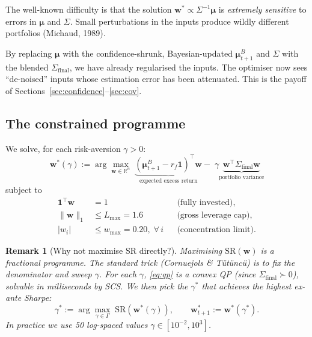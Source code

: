\documentclass[11pt]{article}
\newtheorem{remark}[theorem]{Remark}
\newcommand{\R}{\mathbb{R}}
\newcommand{\bw}{\bm{w}}
\newcommand{\bmu}{\bm{\mu}}
\begin{document}
The well-known difficulty is that the solution $\bw^*\propto\Sigma^{-1}\bmu$
is \emph{extremely sensitive} to errors in $\bmu$ and $\Sigma$.
Small perturbations in the inputs produce wildly different portfolios
(Michaud, 1989).

\begin{tcolorbox}[colback=green!3, colframe=green!40!black, title=Our remedy]
By replacing $\bmu$ with the confidence-shrunk, Bayesian-updated
$\bmu_{t+1}^B$ and $\Sigma$ with the blended $\Sigma_{\mathrm{final}}$,
we have already regularised the inputs.  The optimiser now sees
``de-noised'' inputs whose estimation error has been attenuated.
This is the payoff of Sections~\ref{sec:confidence}--\ref{sec:cov}.
\end{tcolorbox}

\subsection{The constrained programme}

We solve, for each risk-aversion $\gamma>0$:
\begin{equation}\label{eq:qp}
\bw^*(\gamma) := \arg\max_{\bw\in\R^n}\;
  \underbrace{(\bmu_{t+1}^B - r_f\bm{1})^\top\bw}_{\text{expected excess return}}
  -\;\gamma\underbrace{\bw^\top\Sigma_{\mathrm{final}}\bw}_{\text{portfolio variance}}
\end{equation}
subject to
\begin{align}
\bm{1}^\top\bw &= 1 && \text{(fully invested)},\label{eq:budget}\\
\|\bw\|_1 &\le L_{\max}=1.6 && \text{(gross leverage cap)},\label{eq:lev}\\
|w_i| &\le w_{\max}=0.20,\;\forall\,i && \text{(concentration limit)}.\label{eq:conc}
\end{align}

\begin{remark}[Why not maximise SR directly?]
Maximising $\mathrm{SR}(\bw)$ is a fractional programme.
The standard trick (Cornuejols \& T\"ut\"unc\"u) is to fix the denominator
and sweep $\gamma$.  For each $\gamma$, \eqref{eq:qp} is a convex QP
(since $\Sigma_{\mathrm{final}}\succ 0$), solvable in milliseconds by SCS.
We then pick the $\gamma^*$ that achieves the highest ex-ante Sharpe:
\begin{equation}
\gamma^* := \arg\max_{\gamma\in\Gamma}\;\mathrm{SR}(\bw^*(\gamma)),
\qquad \bw_{t+1}^* := \bw^*(\gamma^*).
\end{equation}
In practice we use 50 log-spaced values $\gamma\in[10^{-2},10^3]$.
\end{remark}
\end{document}
